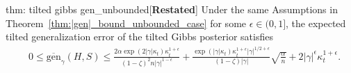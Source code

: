 \documentclass{article}
\theoremstyle{plain}
\theoremstyle{plain}
\theoremstyle{definition}
\theoremstyle{remark}
\begin{document}
\begin{tcolorbox}
    \begin{reptheorem}{thm: tilted gibbs gen_unbounded}[\textbf{Restated}]
        Under the same Assumptions in Theorem~\ref{thm:|gen|_bound_unbounded_case} for some $\epsilon\in(0,1]$, the expected tilted generalization error of the tilted Gibbs posterior satisfies
        \begin{equation}
        \begin{split}
           & 0\leq \overline{\mathrm{gen}}_{\gamma}(H,S)\leq \frac{2\alpha\exp(2|\gamma| \kappa_t)\kappa_t^{1+\epsilon}}{(1-\zeta)^2 n|\gamma|^{1-\epsilon}} +\frac{\exp(|\gamma|\kappa_t)\kappa_t^{1+\epsilon}|\gamma|^{1/2+\epsilon}}{(1-\zeta)|\gamma|}\sqrt{\frac{\alpha}{n}}+2|\gamma|^{\epsilon}\kappa_t^{1+\epsilon}.
                    \end{split}
        \end{equation}
    \end{reptheorem}
    \end{tcolorbox}
\end{document}
